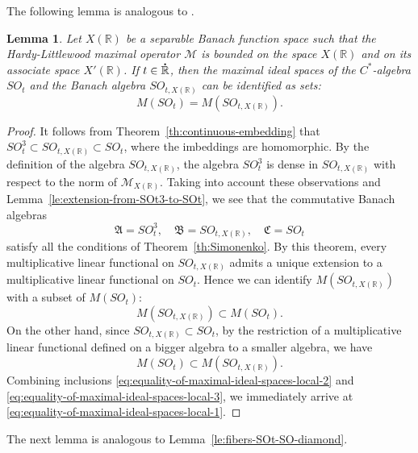 \documentclass{birkjour}
\newtheorem{lemma}[theorem]{Lemma}
\numberwithin{equation}{section}
\newcommand{\R}{\mathbb{R}}
\newcommand{\cM}{\mathcal{M}}
\newcommand{\fA}{\mathfrak{A}}
\newcommand{\fB}{\mathfrak{B}}
\newcommand{\fC}{\mathfrak{C}}
\newcommand{\dR}{{\bf\dot{\R}}}
\begin{document}
The following lemma is analogous to \cite[Lemma~3.5]{KILH13a}.
\begin{lemma}\label{le:equality-of-maximal-ideal-spaces-local}
Let $X(\R)$ be a separable Banach function space such that the Hardy-Littlewood
maximal operator $\cM$ is bounded on the space $X(\R)$ and on its associate
space $X'(\R)$. If $t\in\dR$, then the maximal ideal spaces of the
$C^*$-algebra $SO_t$ and the Banach algebra $SO_{t,X(\R)}$ can be identified
as sets:
\begin{equation}\label{eq:equality-of-maximal-ideal-spaces-local-1}
M(SO_t)=M(SO_{t,X(\R)}).
\end{equation}
\end{lemma}
\begin{proof}
It follows from Theorem~\ref{th:continuous-embedding} that
$SO_t^3\subset SO_{t,X(\R)}\subset SO_t$, where the
imbeddings are homomorphic. By the definition of the algebra
$SO_{t,X(\R)}$, the algebra $SO_t^3$ is dense in $SO_{t,X(\R)}$ with
respect to the norm of $\cM_{X(\R)}$. Taking into account these observations
and Lemma~\ref{le:extension-from-SOt3-to-SOt}, we see that the commutative
Banach algebras
\[
\fA=SO_t^3,\quad \fB=SO_{t,X(\R)},\quad \fC=SO_t
\]
satisfy all the conditions of Theorem~\ref{th:Simonenko}. By this theorem,
every multiplicative linear functional on $SO_{t,X(\R)}$ admits a unique
extension to a multiplicative linear functional on $SO_t$. Hence
we can identify $M(SO_{t,X(\R)})$ with a subset of $M(SO_t)$:
\begin{equation}\label{eq:equality-of-maximal-ideal-spaces-local-2}
M(SO_{t,X(\R)})\subset M(SO_t).
\end{equation}
On the other hand, since $SO_{t,X(\R)}\subset SO_t$, by the restriction of a
multiplicative linear functional defined on a bigger algebra to a smaller
algebra, we have
\begin{equation}\label{eq:equality-of-maximal-ideal-spaces-local-3}
M(SO_t)\subset M(SO_{t,X(\R)}).
\end{equation}
Combining inclusions \eqref{eq:equality-of-maximal-ideal-spaces-local-2}
and \eqref{eq:equality-of-maximal-ideal-spaces-local-3},
we immediately arrive at
\eqref{eq:equality-of-maximal-ideal-spaces-local-1}.
\end{proof}
The next lemma is analogous to Lemma~\ref{le:fibers-SOt-SO-diamond}.
\end{document}
